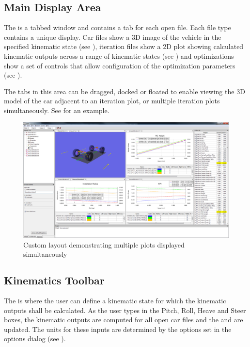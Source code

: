 \subsection{Main Display Area} \label{ssec:mainDisplayArea}

The  is a tabbed window and contains a tab for each open file.  Each file type contains a unique display.  Car files show a 3D image of the vehicle in the specified kinematic state (see ), iteration files show a 2D plot showing calculated kinematic outputs across a range of kinematic states (see ) and optimizations show a set of controls that allow configuration of the optimization parameters (see ).

The tabs in this area can be dragged, docked or floated to enable viewing the 3D model of the car adjacent to an iteration plot, or multiple iteration plots simultaneously.  See  for an example.

\begin{figure}
  \includegraphics[width=\textwidth]{images/multiPlot}
  \caption{Custom layout demonstrating multiple plots displayed simultaneously} \label{fig:multiPlot}
  \centering
\end{figure}

\subsection{Kinematics Toolbar} \label{ssec:kinematicsToolbar}

The  is where the user can define a kinematic state for which the kinematic outputs shall be calculated.  As the user types in the Pitch, Roll, Heave and Steer boxes, the kinematic outputs are computed for all open car files and the  and  are updated.  The units for these inputs are determined by the options set in the options dialog (see ).

